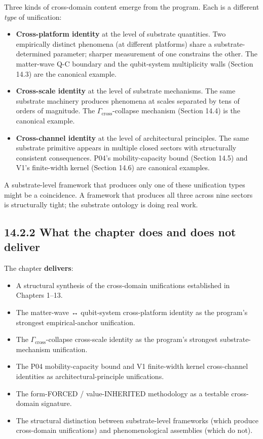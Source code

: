 \documentclass[11pt]{book}
\begin{document}
Three kinds of cross-domain content emerge from the program. Each is a different \textit{type} of unification:

\begin{itemize}
\item \textbf{Cross-platform identity} at the level of substrate quantities. Two empirically distinct phenomena (at different platforms) share a substrate-determined parameter; sharper measurement of one constrains the other. The matter-wave Q-C boundary and the qubit-system multiplicity walls (Section 14.3) are the canonical example.
\item \textbf{Cross-scale identity} at the level of substrate mechanisms. The same substrate machinery produces phenomena at scales separated by tens of orders of magnitude. The $\Gamma_\mathrm{cross}$-collapse mechanism (Section 14.4) is the canonical example.
\item \textbf{Cross-channel identity} at the level of architectural principles. The same substrate primitive appears in multiple closed sectors with structurally consistent consequences. P04's mobility-capacity bound (Section 14.5) and V1's finite-width kernel (Section 14.6) are canonical examples.
\end{itemize}

A substrate-level framework that produces only one of these unification types might be a coincidence. A framework that produces all three across nine sectors is structurally tight; the substrate ontology is doing real work.

\subsection{14.2.2 What the chapter does and does not deliver}

The chapter \textbf{delivers}:
\begin{itemize}
\item A structural synthesis of the cross-domain unifications established in Chapters 1–13.
\item The matter-wave ↔ qubit-system cross-platform identity as the program's strongest empirical-anchor unification.
\item The $\Gamma_\mathrm{cross}$-collapse cross-scale identity as the program's strongest substrate-mechanism unification.
\item The P04 mobility-capacity bound and V1 finite-width kernel cross-channel identities as architectural-principle unifications.
\item The form-FORCED / value-INHERITED methodology as a testable cross-domain signature.
\item The structural distinction between substrate-level frameworks (which produce cross-domain unifications) and phenomenological assemblies (which do not).
\end{itemize}
\end{document}
